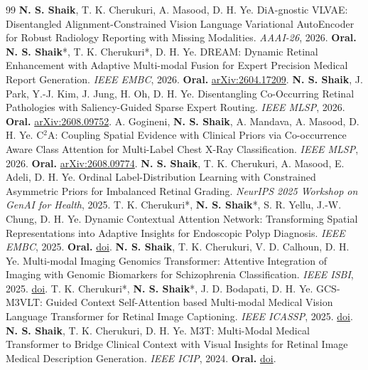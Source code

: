 \documentclass[10pt,letterpaper]{article}
\begin{document}
\small
\renewcommand{\refname}{Selected Publications}
\setlength{\parskip}{1pt}
\begin{thebibliography}{99}
\setlength{\itemsep}{1.5pt}
 \textbf{N. S. Shaik}, T. K. Cherukuri, A. Masood, D. H. Ye. DiA-gnostic VLVAE: Disentangled Alignment-Constrained Vision Language Variational AutoEncoder for Robust Radiology Reporting with Missing Modalities. \textit{AAAI-26}, 2026. \textbf{Oral.}
 \textbf{N. S. Shaik}*, T. K. Cherukuri*, D. H. Ye. DREAM: Dynamic Retinal Enhancement with Adaptive Multi-modal Fusion for Expert Precision Medical Report Generation. \textit{IEEE EMBC}, 2026. \textbf{Oral.} \href{https://arxiv.org/abs/2604.17209}{arXiv:2604.17209}.
 \textbf{N. S. Shaik}, J. Park, Y.-J. Kim, J. Jung, H. Oh, D. H. Ye. Disentangling Co-Occurring Retinal Pathologies with Saliency-Guided Sparse Expert Routing. \textit{IEEE MLSP}, 2026. \textbf{Oral.} \href{https://arxiv.org/abs/2608.09752}{arXiv:2608.09752}.
 A. Gogineni, \textbf{N. S. Shaik}, A. Mandava, A. Masood, D. H. Ye. C$^2$A: Coupling Spatial Evidence with Clinical Priors via Co-occurrence Aware Class Attention for Multi-Label Chest X-Ray Classification. \textit{IEEE MLSP}, 2026. \textbf{Oral.} \href{https://arxiv.org/abs/2608.09774}{arXiv:2608.09774}.
 \textbf{N. S. Shaik}, T. K. Cherukuri, A. Masood, E. Adeli, D. H. Ye. Ordinal Label-Distribution Learning with Constrained Asymmetric Priors for Imbalanced Retinal Grading. \textit{NeurIPS 2025 Workshop on GenAI for Health}, 2025.
 T. K. Cherukuri*, \textbf{N. S. Shaik}*, S. R. Yellu, J.-W. Chung, D. H. Ye. Dynamic Contextual Attention Network: Transforming Spatial Representations into Adaptive Insights for Endoscopic Polyp Diagnosis. \textit{IEEE EMBC}, 2025. \textbf{Oral.} \href{https://doi.org/10.1109/EMBC58623.2025.11254199}{doi}.
 \textbf{N. S. Shaik}, T. K. Cherukuri, V. D. Calhoun, D. H. Ye. Multi-modal Imaging Genomics Transformer: Attentive Integration of Imaging with Genomic Biomarkers for Schizophrenia Classification. \textit{IEEE ISBI}, 2025. \href{https://doi.org/10.1109/ISBI60581.2025.10980651}{doi}.
 T. K. Cherukuri*, \textbf{N. S. Shaik}*, J. D. Bodapati, D. H. Ye. GCS-M3VLT: Guided Context Self-Attention based Multi-modal Medical Vision Language Transformer for Retinal Image Captioning. \textit{IEEE ICASSP}, 2025. \href{https://doi.org/10.1109/ICASSP49660.2025.10890310}{doi}.
 \textbf{N. S. Shaik}, T. K. Cherukuri, D. H. Ye. M3T: Multi-Modal Medical Transformer to Bridge Clinical Context with Visual Insights for Retinal Image Medical Description Generation. \textit{IEEE ICIP}, 2024. \textbf{Oral.} \href{https://doi.org/10.1109/ICIP51287.2024.10647584}{doi}.

\end{thebibliography}
\end{document}
